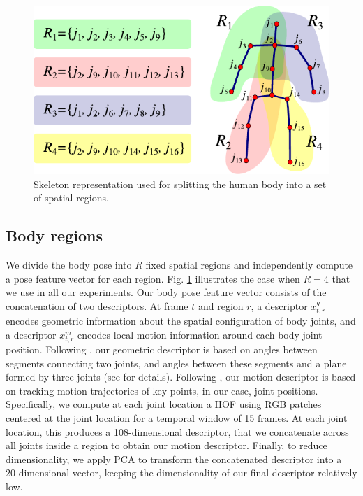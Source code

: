 \begin{figure}[tb]
\begin{center}
\includegraphics[width=0.95\linewidth]{./Fig/fig_joints_limbs_region.pdf}
\end{center}
   \caption{Skeleton representation used for splitting the human body into a set of 
spatial regions.}
\label{fig:skeleton_limbs_regions}
\end{figure}

\subsection{Body regions}
We divide the body pose into $R$ fixed spatial regions and independently compute 
a pose feature vector for each region. Fig. \ref{fig:skeleton_limbs_regions} 
illustrates the case when $R = 4$ that we use in all our experiments. Our body 
pose feature vector consists of the concatenation of two descriptors. At frame 
$t$ and region $r$, a descriptor $x^{g}_{t,r}$ encodes geometric information 
about the spatial configuration of body joints, and a descriptor $x^{m}_{t,r}$ 
encodes local motion information around each body joint position. Following 
\cite{Lillo2014}, our geometric descriptor is based on angles between segments 
connecting two joints, and angles between these segments and a plane formed by 
three joints (see \cite{Lillo2014} for details). Following \cite{WangCVPR2011}, 
our motion descriptor is based on tracking motion trajectories of key points, in 
our case, joint positions. Specifically, we compute at each joint location a HOF 
using RGB patches centered at the joint location for a temporal window of 15 
frames. At each joint location, this produces a 108-dimensional descriptor,  
that we concatenate across all joints inside a region to obtain our motion descriptor. Finally, 
to reduce dimensionality, we apply PCA to transform the concatenated descriptor 
into a 20-dimensional vector, keeping the dimensionality of our final descriptor 
relatively low.


